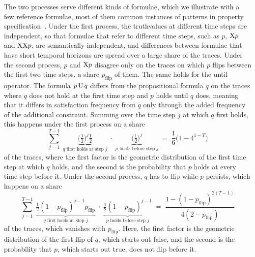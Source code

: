 \documentclass[titlepage,a4paper,11pt]{report}
\begin{document}
    The two processes serve different kinds of formulae, which we illustrate with a few reference formulae, most of them common instances of patterns in property specification~\citep{dwyer_patterns_1999}. Under the first process, the truthvalues at different time steps are independent, so that formulae that refer to different time steps, such as $p$, $\text{X} p$ and $\text{X}\text{X} p$, are semantically independent, and differences between formulae that have short temporal horizons are spread over a large share of the traces. Under the second process, $p$ and $\text{X} p$ disagree only on the traces on which $p$ flips between the first two time steps, a share $p_{\text{flip}}$ of them. The same holds for the until operator. The formula $p\,\text{U}\,q$ differs from the propositional formula $q$ on the traces where $q$ does not hold at the first time step and $p$ holds until $q$ does, meaning that it differs in satisfaction frequency from $q$ only through the added frequency of the additional constraint. Summing over the time step $j$ at which $q$ first holds, this happens under the first process on a share
    \begin{equation*}
        \sum_{j=1}^{T-1}\;\underbrace{\bigl(\tfrac12\bigr)^{j}\tfrac12}_{q\text{ first holds at step }j}\;\cdot\;\underbrace{\bigl(\tfrac12\bigr)^{j}}_{p\text{ holds before step }j}\;=\;\frac16\bigl(1-4^{1-T}\bigr)
    \end{equation*}
    of the traces, where the first factor is the geometric distribution of the first time step at which $q$ holds, and the second is the probability that $p$ holds at every time step before it. Under the second process, $q$ has to flip while $p$ persists, which happens on a share
    \begin{equation*}
        \sum_{j=1}^{T-1}\;\underbrace{\tfrac12(1-p_{\text{flip}})^{j-1}p_{\text{flip}}}_{q\text{ first holds at step }j}\;\cdot\;\underbrace{\tfrac12(1-p_{\text{flip}})^{j-1}}_{p\text{ holds before step }j}\;=\;\frac{1-(1-p_{\text{flip}})^{2(T-1)}}{4(2-p_{\text{flip}})}
    \end{equation*}
    of the traces, which vanishes with $p_{\text{flip}}$. Here, the first factor is the geometric distribution of the first flip of $q$, which starts out false, and the second is the probability that $p$, which starts out true, does not flip before it.
 
\end{document}
